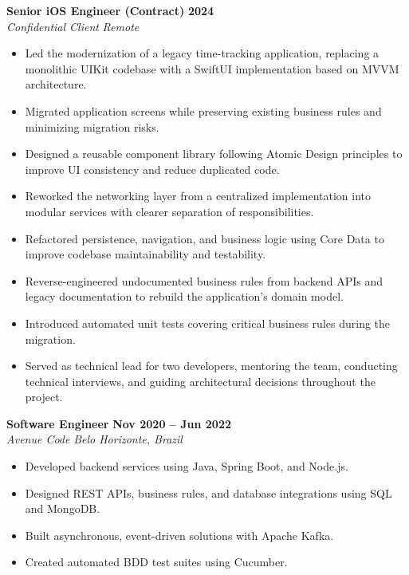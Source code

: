 \documentclass[10pt,a4paper]{article}
\newcommand{\job}[4]{%
    \textbf{#1} \hfill \textbf{#2}\\
    \textit{#3} \hfill \textit{#4}\\[-2pt]
}
\begin{document}

\job{Senior iOS Engineer (Contract)}{2024}{Confidential Client}{Remote}

\begin{itemize}
    \item Led the modernization of a legacy time-tracking application, replacing a monolithic UIKit codebase with a SwiftUI implementation based on MVVM architecture.
    \item Migrated application screens while preserving existing business rules and minimizing migration risks.
    \item Designed a reusable component library following Atomic Design principles to improve UI consistency and reduce duplicated code.
    \item Reworked the networking layer from a centralized implementation into modular services with clearer separation of responsibilities.
    \item Refactored persistence, navigation, and business logic using Core Data to improve codebase maintainability and testability.
    \item Reverse-engineered undocumented business rules from backend APIs and legacy documentation to rebuild the application's domain model.
    \item Introduced automated unit tests covering critical business rules during the migration.
    \item Served as technical lead for two developers, mentoring the team, conducting technical interviews, and guiding architectural decisions throughout the project.
\end{itemize}


\job{Software Engineer}{Nov 2020 -- Jun 2022}{Avenue Code}{Belo Horizonte, Brazil}

\begin{itemize}
    \item Developed backend services using Java, Spring Boot, and Node.js.
    \item Designed REST APIs, business rules, and database integrations using SQL and MongoDB.
    \item Built asynchronous, event-driven solutions with Apache Kafka.
    \item Created automated BDD test suites using Cucumber.
\end{itemize}
\end{document}
